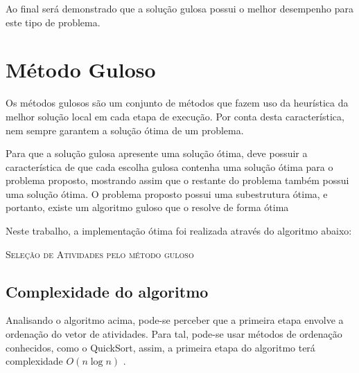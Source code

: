 \documentclass[12pt]{article}
\begin{document}
Ao final será demonstrado que a solução gulosa possui o melhor desempenho para este tipo de problema.

\section{Método Guloso} \label{sec:guloso}

Os métodos gulosos são um conjunto de métodos que fazem uso da heurística da melhor solução local em cada etapa de execução. Por conta desta característica, nem sempre garantem a solução ótima de um problema.

Para que a solução gulosa apresente uma solução ótima, deve possuir a característica de que cada escolha gulosa contenha uma solução ótima para o problema proposto, mostrando assim que o restante do problema também possui uma solução ótima.
O problema proposto possui uma subestrutura ótima, e portanto, existe um algoritmo guloso que o resolve de forma ótima

Neste trabalho, a implementação ótima foi realizada através do algoritmo abaixo:

 \begin{algorithm}[H]
   \SetAlgoLined
   \label{alg1}
   \caption{\textsc{Seleção de Atividades pelo método guloso}}
 \end{algorithm}

\subsection{Complexidade do algoritmo}
Analisando o algoritmo acima, pode-se perceber que a primeira etapa envolve a ordenação do vetor de atividades. Para tal, pode-se usar métodos de ordenação conhecidos, como o QuickSort, assim, a primeira etapa do algoritmo terá complexidade $O(n\log{}n)$ .
\end{document}
